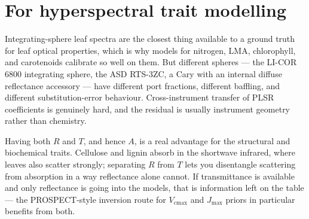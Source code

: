\documentclass[11pt,letterpaper]{article}
\newcommand{\Vcmax}{\ensuremath{V_{\mathrm{cmax}}}}
\newcommand{\Jmax}{\ensuremath{J_{\mathrm{max}}}}
\begin{document}
\section{For hyperspectral trait modelling}

Integrating-sphere leaf spectra are the closest thing available to a ground truth for leaf optical
properties, which is why models for nitrogen, LMA, chlorophyll, and carotenoids calibrate so well on
them. But different spheres --- the LI-COR 6800 integrating sphere, the ASD RTS-3ZC, a Cary with an
internal diffuse reflectance accessory --- have different port fractions, different baffling, and
different substitution-error behaviour. Cross-instrument transfer of PLSR coefficients is genuinely
hard, and the residual is usually instrument geometry rather than chemistry.

Having both $R$ and $T$, and hence $A$, is a real advantage for the structural and biochemical
traits. Cellulose and lignin absorb in the shortwave infrared, where leaves also scatter strongly;
separating $R$ from $T$ lets you disentangle scattering from absorption in a way reflectance alone
cannot. If transmittance is available and only reflectance is going into the models, that is
information left on the table --- the PROSPECT-style inversion route for \Vcmax{} and \Jmax{} priors
in particular benefits from both.
\end{document}
